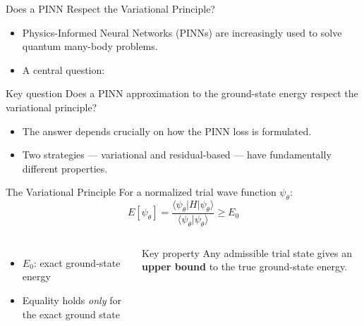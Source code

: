 \documentclass[aspectratio=169,10pt]{beamer}
\begin{document}
\begin{frame}{Does a PINN Respect the Variational Principle?}
  \begin{itemize}
    \item Physics-Informed Neural Networks (PINNs) are increasingly used
          to solve quantum many-body problems.
    \item A central question:
  \end{itemize}

  \vspace{0.2cm}
  \begin{block}{Key question}
    Does a PINN approximation to the ground-state energy respect the
    variational principle?
  \end{block}

  \vspace{0.2cm}
  \begin{itemize}
    \item The answer depends crucially on how the PINN loss is formulated.
    \item Two strategies — \alert{variational} and \alert{residual-based} —
          have fundamentally different properties.
  \end{itemize}
\end{frame}

\begin{frame}{The Variational Principle}
  For a normalized trial wave function $\psi_\theta$:
  \[
    E[\psi_\theta]
    = \frac{\langle\psi_\theta|H|\psi_\theta\rangle}
           {\langle\psi_\theta|\psi_\theta\rangle}
    \geq E_0
  \]

  \begin{columns}[T]
      \begin{itemize}
        \item $E_0$: exact ground-state energy
        \item Equality holds \emph{only} for the exact ground state
      \end{itemize}
      \begin{block}{Key property}
        Any admissible trial state gives an \textbf{upper bound} to the
        true ground-state energy.
      \end{block}
  \end{columns}
\end{frame}
\end{document}
